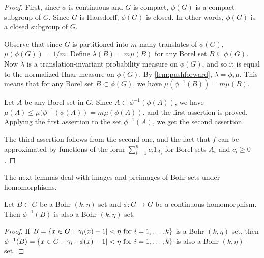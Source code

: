 \begin{proof}
First, since $\phi$ is continuous and $G$ is compact, $\phi(G)$ is a compact subgroup of $G$. Since $G$ is Hausdorff, $\phi(G)$ is closed. In other words, $\phi(G)$ is a closed subgroup of $G$. 


Observe that since $G$ is partitioned into $m$-many translates of $\phi(G)$, $\mu(\phi(G)) = 1/m$.
Define $\lambda(B) = m \mu(B)$ for any Borel set $B \subseteq \phi(G)$. Now $\lambda$ is a translation-invariant probability measure on $\phi(G)$, and so it is equal to the normalized Haar measure on $\phi(G)$. By \cref{lem:pushforward}, $\lambda = \phi_* \mu$. This means that for any Borel set $B \subset \phi(G)$, we have $\mu(\phi^{-1}(B)) = m \mu(B)$.

Let $A$ be any Borel set in $G$. Since $A \subset \phi^{-1}(\phi(A))$, we have $\mu(A) \leq \mu(\phi^{-1}(\phi(A)) = m \mu(\phi(A))$, and the first assertion is proved. Applying the first assertion to the set $\phi^{-1}(A)$, we get the second assertion. 

The third assertion follows from the second one, and the fact that $f$ can be approximated by functions of the form $\sum_{i=1}^n c_i 1_{A_i}$ for Borel sets $A_i$ and $c_i \geq 0$.
\end{proof}

The next lemmas deal with images and preimages of Bohr sets under homomorphisms.
 
\begin{lemma} \label{lem:bohr-homo1}
Let $B \subset G$ be a Bohr-$(k, \eta)$ set and $\phi: G \rightarrow G$ be a continuous homomorphism. Then $\phi^{-1}(B)$ is also a Bohr-$(k, \eta)$ set.
\end{lemma}

\begin{proof}
If $B = \{ x \in G: |\gamma_i(x) -1| < \eta \textup{ for }i=1,  \ldots,  k\}$ is a Bohr-$(k, \eta)$ set, then $\phi^{-1}(B) = \{ x \in G: |\gamma_i \circ \phi (x) -1| < \eta \textup{ for }i=1,  \ldots,  k\}$ is also a Bohr-$(k, \eta)$-set.
\end{proof}


